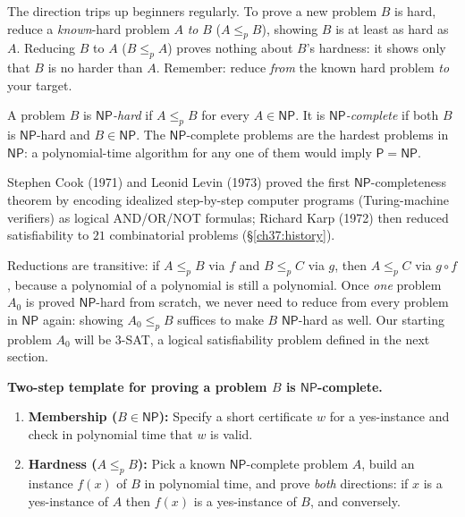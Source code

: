 \begin{trapbox}
The direction trips up beginners regularly. To prove a new problem $B$ is
hard, reduce a \emph{known}-hard problem $A$ \emph{to} $B$ ($A\le_p B$), showing
$B$ is at least as hard as $A$. Reducing
$B$ to $A$ ($B\le_p A$) proves nothing about $B$'s hardness: it shows only that $B$ is no harder than $A$. Remember: reduce \emph{from} the known hard problem \emph{to} your target.
\end{trapbox}

\begin{definition}
\label{ch37:def-npc}
A problem $B$ is \emph{$\mathsf{NP}$-hard} if $A\le_p B$ for every $A\in
\mathsf{NP}$. It is \emph{$\mathsf{NP}$-complete} if both $B$ is $\mathsf{NP}$-hard and $B\in
\mathsf{NP}$. The $\mathsf{NP}$-complete problems are the hardest problems in
$\mathsf{NP}$: a polynomial-time algorithm for any one of them would imply
$\mathsf{P}=\mathsf{NP}$.
\end{definition}

\begin{marginnotebox}
Stephen Cook (1971) and Leonid Levin (1973) proved the first $\mathsf{NP}$-completeness theorem by encoding idealized step-by-step computer programs (Turing-machine verifiers) as logical AND/OR/NOT formulas; Richard Karp (1972) then reduced satisfiability to $21$ combinatorial problems (\S\ref{ch37:history}).
\end{marginnotebox}

Reductions are transitive: if $A\le_p B$ via $f$ and $B\le_p C$ via $g$, then $A\le_p C$ via $g\circ f$, because a polynomial of a polynomial is still a polynomial. Once
\emph{one} problem $A_0$ is proved $\mathsf{NP}$-hard from scratch, we never need to reduce from every problem in $\mathsf{NP}$ again: showing $A_0 \le_p B$ suffices to make $B$ $\mathsf{NP}$-hard as well. Our starting problem $A_0$ will be \textsc{3-SAT}, a logical satisfiability problem defined in the next section.

\begin{focusbox}
\textbf{Two-step template for proving a problem $B$ is $\mathsf{NP}$-complete.}
\begin{enumerate}
  \item \textbf{Membership ($B\in\mathsf{NP}$):} Specify a short certificate $w$ for a yes-instance and check in polynomial time that $w$ is valid.
  \item \textbf{Hardness ($A\le_p B$):} Pick a known $\mathsf{NP}$-complete problem $A$, build an instance $f(x)$ of $B$ in polynomial time, and prove \emph{both} directions: if $x$ is a yes-instance of $A$ then $f(x)$ is a yes-instance of $B$, and conversely.
\end{enumerate}
\end{focusbox}

